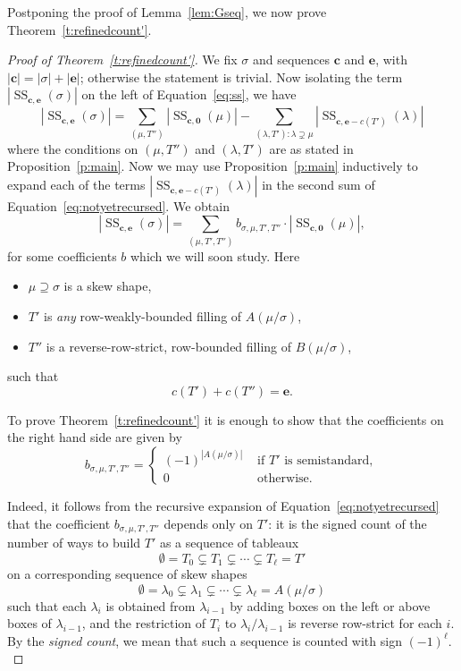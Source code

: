 \documentclass[ALCO,ThmDefs,Unicode,epreuves]{cedram}
\DeclareMathOperator{\Semi}{SS}
\newcommand{\bfc}{\mathbf{c}}
\newcommand{\bfe}{\mathbf{e}}
\begin{document}
Postponing the proof of Lemma~\ref{lem:Gseq}, we now prove Theorem~\ref{t:refinedcount'}. 

\begin{proof}[Proof of Theorem~\ref{t:refinedcount'}] 
We fix $\sigma$ and sequences $\bfc$ and $\bfe$, with $|\bfc| = |\sigma| + |\bfe|$; otherwise the statement is trivial. Now isolating the term $|\Semi_{\bfc, \bfe}(\sigma)|$ on the left of Equation~\eqref{eq:ss}, we have
\begin{equation}\label{eq:notyetrecursed}
|\Semi_{\bfc, \bfe}(\sigma)| = \sum_{(\mu,T'')} |\Semi_{\bfc, \mathbf{0}}(\mu)| - \sum_{(\lambda, T'): \lambda\supsetneq \mu } |\Semi_{\bfc, \bfe-c(T')}(\lambda)|
\end{equation}
where the conditions on $(\mu,T'')$ and $(\lambda,T')$ are as stated in Proposition~\ref{p:main}. Now we may use Proposition~\ref{p:main} inductively to expand each of the terms $|\Semi_{\bfc, \bfe-c(T')}(\lambda)|$ in the second sum of Equation~\eqref{eq:notyetrecursed}. We obtain
\begin{equation}\label{eq:nowrecursed}
|\Semi_{\bfc, \bfe}(\sigma)| = \sum_{(\mu,T',T'')} b_{\sigma,\mu,T',T''} \cdot |\Semi_{\bfc, \mathbf{0}}(\mu)|,
\end{equation}
 for some coefficients $b$ which we will soon study. Here
\begin{itemize}
\item $\mu\supseteq \sigma$ is a skew shape,
\item $T'$ is \emph{any} row-weakly-bounded filling of $A(\mu/\sigma)$, 
\item $T''$ is a reverse-row-strict, row-bounded filling of $B(\mu/\sigma)$,
\end{itemize}
such that
\[
c(T') + c(T'') = \bfe.
\]

To prove Theorem~\ref{t:refinedcount'} it is enough to show that the coefficients on the right hand side are given by
\[
b_{\sigma,\mu,T',T''} = \begin{cases}
(-1)^{|A(\mu/\sigma)|} &\text{ if $T'$ is semistandard}, \\ 
0 & \text{ otherwise.}
\end{cases}
\]

Indeed, it follows from the recursive expansion of Equation~\eqref{eq:notyetrecursed} that the coefficient $b_{\sigma,\mu,T',T''}$ depends only on $T'$: it is
the signed count of the number of ways to build $T'$ as a sequence of tableaux
\[
\emptyset = T_0 \subsetneq T_1 \subsetneq \cdots \subsetneq T_\ell = T'
\]
on a corresponding sequence of skew shapes
\[
\emptyset = \lambda_0 \subsetneq \lambda_1 \subsetneq \cdots \subsetneq \lambda_\ell = A(\mu/\sigma)\]
 such that each $\lambda_i$ is obtained from $\lambda_{i-1}$ by adding boxes on the left or above boxes of $\lambda_{i-1}$, and the restriction of $T_i$ to $\lambda_i/\lambda_{i-1}$ is reverse row-strict for each $i$. By the \emph{signed count}, we mean that such a sequence is counted with sign $(-1)^\ell.$ 


\end{proof}
\end{document}
